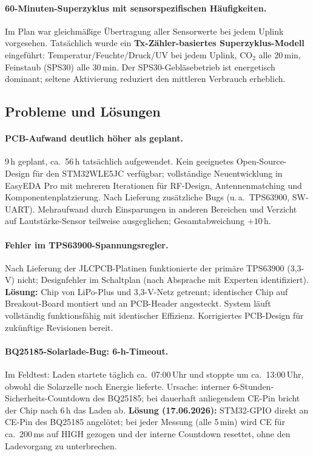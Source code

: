 \documentclass[11pt,a4paper]{scrartcl}
\begin{document}
\paragraph{60-Minuten-Superzyklus mit sensorspezifischen Häufigkeiten.}
Im Plan war gleichmäßige Übertragung aller Sensorwerte bei jedem Uplink vorgesehen. Tatsächlich wurde ein \textbf{Tx-Zähler-basiertes Superzyklus-Modell} eingeführt: Temperatur/Feuchte/Druck/UV bei jedem Uplink, CO$_2$ alle 20\,min, Feinstaub (SPS30) alle 30\,min. Der SPS30-Gebläsebetrieb ist energetisch dominant; seltene Aktivierung reduziert den mittleren Verbrauch erheblich.

\subsection*{Probleme und Lösungen}

\paragraph{PCB-Aufwand deutlich höher als geplant.}
9\,h geplant, ca.~56\,h tatsächlich aufgewendet. Kein geeignetes Open-Source-Design für den STM32WLE5JC verfügbar; vollständige Neuentwicklung in EasyEDA Pro mit mehreren Iterationen für RF-Design, Antennenmatching und Komponentenplatzierung. Nach Lieferung zusätzliche Bugs (u.\,a.\ TPS63900, SW-UART). Mehraufwand durch Einsparungen in anderen Bereichen und Verzicht auf Lautstärke-Sensor teilweise ausgeglichen; Gesamtabweichung $+10\,\text{h}$.

\paragraph{Fehler im TPS63900-Spannungsregler.}
Nach Lieferung der JLCPCB-Platinen funktionierte der primäre TPS63900 (3,3-V) nicht; Designfehler im Schaltplan (nach Absprache mit Experten identifiziert). \textbf{Lösung:} Chip von LiPo-Plus und 3,3-V-Netz getrennt; identischer Chip auf Breakout-Board montiert und an PCB-Header angesteckt. System läuft vollständig funktionsfähig mit identischer Effizienz. Korrigiertes PCB-Design für zukünftige Revisionen bereit.

\paragraph{BQ25185-Solarlade-Bug: 6-h-Timeout.}
Im Feldtest: Laden startete täglich ca.~07:00\,Uhr und stoppte um ca.~13:00\,Uhr, obwohl die Solarzelle noch Energie lieferte. Ursache: interner 6-Stunden-Sicherheits-Countdown des BQ25185; bei dauerhaft anliegendem CE-Pin bricht der Chip nach 6\,h das Laden ab. \textbf{Lösung (17.06.2026):} STM32-GPIO direkt an CE-Pin des BQ25185 angelötet; bei jeder Messung (alle 5\,min) wird CE für ca.~200\,ms auf HIGH gezogen und der interne Countdown resettet, ohne den Ladevorgang zu unterbrechen.
\end{document}
